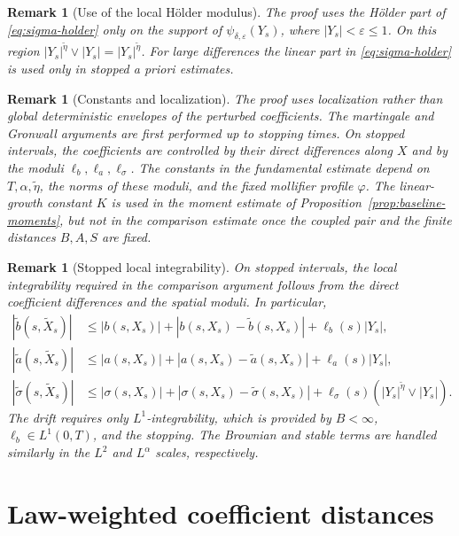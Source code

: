 \documentclass[10pt,a4paper]{amsart}
\newtheorem{remark}[theorem]{Remark}
\newcommand{\1}{\mathbf{1}}
\newcommand{\wt}{\tilde}
\newcommand{\eps}{\varepsilon}
\begin{document}
\begin{remark}[Use of the local H\"older modulus]
The proof uses the H\"older part of \eqref{eq:sigma-holder} only on the support of $\psi_{\delta,\eps}(Y_s)$, where $|Y_s|<\eps\le1$. On this region $|Y_s|^{\wt\eta}\vee |Y_s|=|Y_s|^{\wt\eta}$. For large differences the linear part in \eqref{eq:sigma-holder} is used only in stopped a priori estimates.
\end{remark}

\begin{remark}[Constants and localization]
The proof uses localization rather than global deterministic envelopes of the perturbed coefficients. The martingale and Gronwall arguments are first performed up to stopping times. On stopped intervals, the coefficients are controlled by their direct differences along $X$ and by the moduli $\ell_b,\ell_a,\ell_\sigma$. The constants in the fundamental estimate depend on $T,\alpha,\wt\eta$, the norms of these moduli, and the fixed mollifier profile $\varphi$. The linear-growth constant $K$ is used in the moment estimate of Proposition~\ref{prop:baseline-moments}, but not in the comparison estimate once the coupled pair and the finite distances $B,A,S$ are fixed.
\end{remark}

\begin{remark}[Stopped local integrability]
On stopped intervals, the local integrability required in the comparison argument follows from the direct coefficient differences and the spatial moduli. In particular,
\begin{align*}
|\wt b(s,\wt X_s)|&\le |b(s,X_s)|+|b(s,X_s)-\wt b(s,X_s)|+\ell_b(s)|Y_s|,\\
|\wt a(s,\wt X_s)|&\le |a(s,X_s)|+|a(s,X_s)-\wt a(s,X_s)|+\ell_a(s)|Y_s|,\\
|\wt\sigma(s,\wt X_s)|&\le |\sigma(s,X_s)|+|\sigma(s,X_s)-\wt\sigma(s,X_s)|
 +\ell_\sigma(s)(|Y_s|^{\wt\eta}\vee |Y_s|).
\end{align*}
The drift requires only $L^1$-integrability, which is provided by $B<\infty$, $\ell_b\in L^1(0,T)$, and the stopping. The Brownian and stable terms are handled similarly in the $L^2$ and $L^\alpha$ scales, respectively.
\end{remark}


\section{Law-weighted coefficient distances}
\label{sec:distances}
\end{document}

